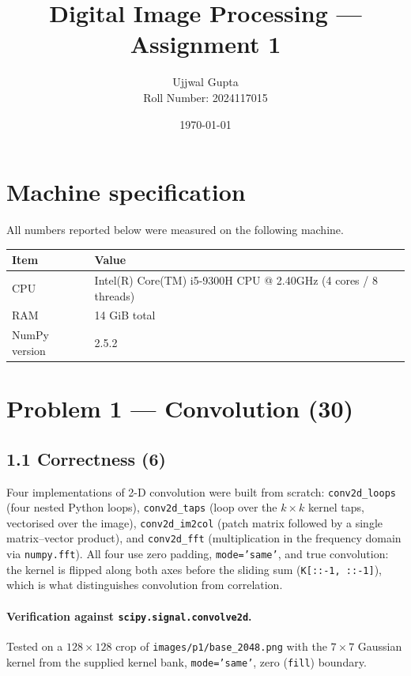 \documentclass[11pt]{article}
\title{Digital Image Processing --- Assignment 1}
\author{Ujjwal Gupta \\ Roll Number: 2024117015}
\date{\today}
\begin{document}
\maketitle

\section*{Machine specification}
All numbers reported below were measured on the following machine.

\begin{table}[H]
\centering
\begin{tabular}{ll}
\toprule
Item & Value \\
\midrule
CPU & Intel(R) Core(TM) i5-9300H CPU @ 2.40GHz (4 cores / 8 threads) \\
RAM & 14 GiB total \\
NumPy version & 2.5.2 \\
\bottomrule
\end{tabular}
\end{table}

\tableofcontents

\section{Problem 1 --- Convolution (30)}

\subsection*{1.1 Correctness (6)}

Four implementations of 2-D convolution were built from scratch: \texttt{conv2d\_loops} (four
nested Python loops), \texttt{conv2d\_taps} (loop over the $k \times k$ kernel taps, vectorised
over the image), \texttt{conv2d\_im2col} (patch matrix followed by a single matrix--vector
product), and \texttt{conv2d\_fft} (multiplication in the frequency domain via
\texttt{numpy.fft}). All four use zero padding, \texttt{mode='same'}, and true convolution: the
kernel is flipped along both axes before the sliding sum (\texttt{K[::-1, ::-1]}), which is what
distinguishes convolution from correlation.

\paragraph{Verification against \texttt{scipy.signal.convolve2d}.} Tested on a $128 \times 128$
crop of \texttt{images/p1/base\_2048.png} with the $7\times7$ Gaussian kernel from the supplied
kernel bank, \texttt{mode='same'}, zero (\texttt{fill}) boundary.
\end{document}
